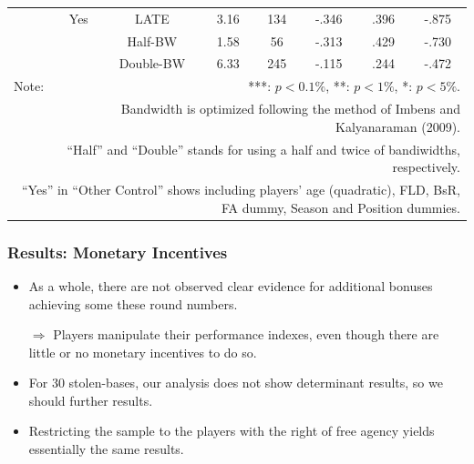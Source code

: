 \documentclass[dvipdfmx,12pt]{beamer}
\begin{document}
\begin{frame}
\begin{table}[!]
\begin{tabular}{lccccccc}
      & Yes & LATE & 3.16 & 134 & -.346 & .396 & -.875 \\
      & & Half-BW & 1.58 & 56 & -.313 & .429 & -.730 \\
      & & Double-BW & 6.33 & 245 & -.115 & .244 & -.472 \\ \hline

      Note: & \multicolumn{7}{r}{***: $p<0.1\%$, **: $p<1\%$, *: $p<5\%$.} \\
      & \multicolumn{7}{r}{Bandwidth is optimized following the method of Imbens and Kalyanaraman (2009).} \\
      & \multicolumn{7}{r}{``Half'' and ``Double'' stands for using a half and twice of bandiwidths, respectively.} \\
      \multicolumn{8}{r}{
      ``Yes'' in ``Other Control'' shows including players' age (quadratic), FLD, BsR, FA dummy, Season and Position dummies.
      }
    \end{tabular}
  \end{table}
\end{frame}


\begin{frame}\frametitle{Results: Monetary Incentives}
  \begin{itemize}
    \item As a whole, there are not observed clear evidence for additional bonuses achieving some these round numbers.

    $\Rightarrow$ Players manipulate their performance indexes, even though there are little or no monetary incentives to do so.

    \item For 30 stolen-bases, our analysis does not show determinant results, so we should further results.

    \item Restricting the sample to the players with the right of free agency yields essentially the same results.

  \end{itemize}
\end{frame}
\end{document}
